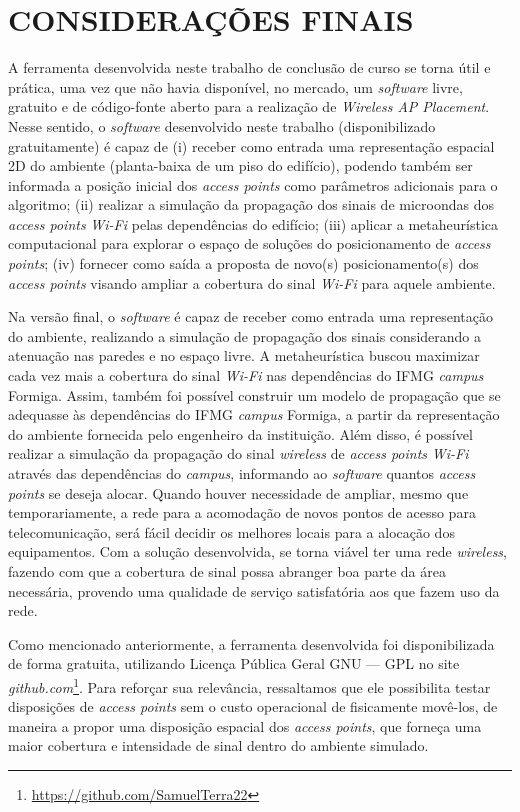 \documentclass[
	12pt,				%
	twoside,			%
	a4paper,			%
	english,			%
	french,				%
	spanish,			%
	brazil				%
	]{abntex2}
\begin{document}
\chapter{CONSIDERAÇÕES FINAIS}\label{sec:consideracoes}

A ferramenta desenvolvida neste trabalho de conclusão de curso se torna
útil e prática, uma vez que não havia disponível, no mercado, um
\emph{software} livre, gratuito e de código-fonte aberto para a
realização de \emph{Wireless AP Placement}. Nesse sentido, o
\emph{software} desenvolvido neste trabalho (disponibilizado
gratuitamente) é capaz de (i) receber como entrada uma representação
espacial 2D do ambiente (planta-baixa de um piso do edifício), podendo
também ser informada a posição inicial dos \emph{access points} como
parâmetros adicionais para o algoritmo; (ii) realizar a simulação da
propagação dos sinais de microondas dos \emph{access points}
\emph{Wi-Fi} pelas dependências do edifício; (iii) aplicar a
metaheurística computacional para explorar o espaço de soluções do
posicionamento de \emph{access points}; (iv) fornecer como saída a
proposta de novo(s) posicionamento(s) dos \emph{access points} visando
ampliar a cobertura do sinal \emph{Wi-Fi} para aquele ambiente.

Na versão final, o \emph{software} é capaz de receber como entrada uma
representação do ambiente, realizando a simulação de propagação dos
sinais considerando a atenuação nas paredes e no espaço livre. A
metaheurística buscou maximizar cada vez mais a cobertura do sinal
\emph{Wi-Fi} nas dependências do IFMG \emph{campus} Formiga. Assim,
também foi possível construir um modelo de propagação que se adequasse
às dependências do IFMG \emph{campus} Formiga, a partir da representação
do ambiente fornecida pelo engenheiro da instituição. Além disso, é
possível realizar a simulação da propagação do sinal \emph{wireless} de
\emph{access points} \emph{Wi-Fi} através das dependências do
\emph{campus}, informando ao \emph{software} quantos \emph{access
points} se deseja alocar. Quando houver necessidade de ampliar, mesmo
que temporariamente, a rede para a acomodação de novos pontos de acesso
para telecomunicação, será fácil decidir os melhores locais para a
alocação dos equipamentos. Com a solução desenvolvida, se torna viável
ter uma rede \emph{wireless}, fazendo com que a cobertura de sinal possa
abranger boa parte da área necessária, provendo uma qualidade de serviço
satisfatória aos que fazem uso da rede.

Como mencionado anteriormente, a ferramenta desenvolvida foi
disponibilizada de forma gratuita, utilizando Licença Pública Geral GNU
--- GPL no site \emph{github.com}\footnote{\url{https://github.com/SamuelTerra22}}.
Para reforçar sua relevância, ressaltamos que ele possibilita testar
disposições de \emph{access points} sem o custo operacional de
fisicamente movê-los, de maneira a propor uma disposição espacial dos
\emph{access points}, que forneça uma maior cobertura e intensidade de
sinal dentro do ambiente simulado.
\end{document}
